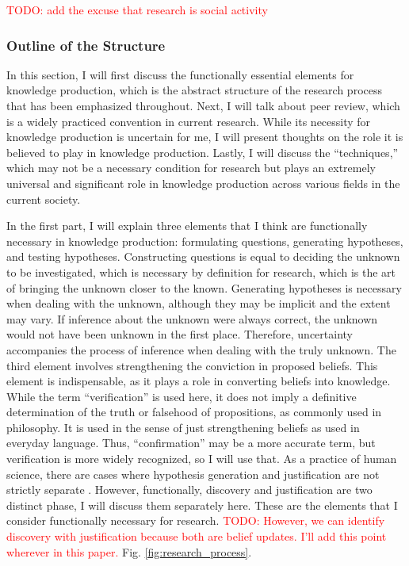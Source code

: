 \documentclass{book}
\begin{document}
\textcolor{red}{TODO: add the excuse that research is social activity}

\subsubsection{Outline of the Structure}
In this section, I will first discuss the functionally essential elements for knowledge production, which is the abstract structure of the research process that has been emphasized throughout. Next, I will talk about peer review, which is a widely practiced convention in current research. While its necessity for knowledge production is uncertain for me, I will present thoughts on the role it is believed to play in knowledge production. Lastly, I will discuss the ``techniques,'' which may not be a necessary condition for research but plays an extremely universal and significant role in knowledge production across various fields in the current society.


In the first part, I will explain three elements that I think are functionally necessary in knowledge production: formulating questions, generating hypotheses, and testing hypotheses. Constructing questions is equal to deciding the unknown to be investigated, which is necessary by definition for research, which is the art of bringing the unknown closer to the known. Generating hypotheses is necessary when dealing with the unknown, although they may be implicit and the extent may vary. If inference about the unknown were always correct, the unknown would not have been unknown in the first place. Therefore, uncertainty accompanies the process of inference when dealing with the truly unknown. The third element involves strengthening the conviction in proposed beliefs. This element is indispensable, as it plays a role in converting beliefs into knowledge. While the term ``verification'' is used here, it does not imply a definitive determination of the truth or falsehood of propositions, as commonly used in philosophy. It is used in the sense of just strengthening beliefs as used in everyday language. Thus, ``confirmation'' may be a more accurate term, but verification is more widely recognized, so I will use that. As a practice of human science, there are cases where hypothesis generation and justification are not strictly separate \cite{arabatzis2006inextricability}. However, functionally, discovery and justification are two distinct phase, I will discuss them separately here. These are the elements that I consider functionally necessary for research. \textcolor{red}{TODO: However, we can identify discovery with justification because both are belief updates. I'll add this point wherever in this paper.} Fig. \ref{fig:research_process}.
\end{document}
